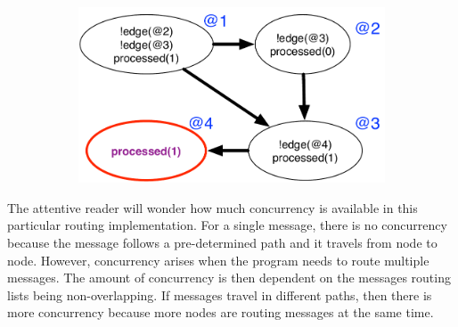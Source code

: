 \begin{figure}[h]
\begin{subfigure}[b]{\visitsize\textwidth}
                \label{fig:message_trace3}
        \end{subfigure}%
        ~
        \begin{subfigure}[b]{\visitsize\textwidth}
                  \includegraphics[width=\textwidth]{figures/message/message_trace4}
                  \label{fig:message_trace4}
          \end{subfigure}
        \label{fig:message_trace}
\end{figure}

The attentive reader will wonder how much concurrency is available in this
particular routing implementation. For a single message, there is no concurrency
because the message follows a pre-determined path and it travels from node to
node. However, concurrency arises when the program needs to route multiple
messages. The amount of concurrency is then dependent on the messages routing
lists being non-overlapping. If messages travel in different paths, then there
is more concurrency because more nodes are routing messages at the same time.
